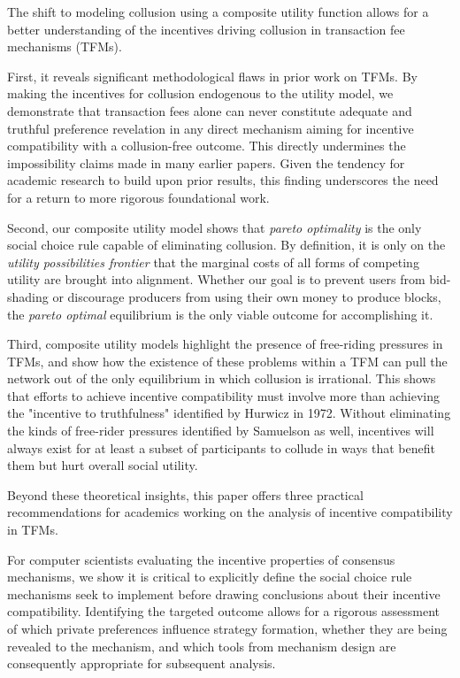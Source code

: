\documentclass[oneside]{article}   	%
\begin{document}
The shift to modeling collusion using a composite utility function allows for a better understanding of the incentives driving collusion in transaction fee mechanisms (TFMs).

First, it reveals significant methodological flaws in prior work on TFMs. By making the incentives for collusion endogenous to the utility model, we demonstrate that transaction fees alone can never constitute adequate and truthful preference revelation in any direct mechanism aiming for incentive compatibility with a collusion-free outcome. This directly undermines the impossibility claims made in many earlier papers. Given the tendency for academic research to build upon prior results, this finding underscores the need for a return to more rigorous foundational work.

Second, our composite utility model shows that \textit{pareto optimality} is the only social choice rule capable of eliminating collusion. By definition, it is only on the \textit{utility possibilities frontier} that the marginal costs of all forms of competing utility are brought into alignment. Whether our goal is to prevent users from bid-shading or discourage producers from using their own money to produce blocks, the \textit{pareto optimal} equilibrium is the only viable outcome for accomplishing it. 

Third, composite utility models highlight the presence of free-riding pressures in TFMs, and show how the existence of these problems within a TFM can pull the network out of the only equilibrium in which collusion is irrational. This shows that efforts to achieve incentive compatibility must involve more than achieving the "incentive to truthfulness" identified by Hurwicz in 1972. Without eliminating the kinds of free-rider pressures identified by Samuelson as well, incentives will always exist for at least a subset of participants to collude in ways that benefit them but hurt overall social utility.

Beyond these theoretical insights, this paper offers three practical recommendations for academics working on the analysis of incentive compatibility in TFMs.

For computer scientists evaluating the incentive properties of consensus mechanisms, we show it is critical to explicitly define the social choice rule mechanisms seek to implement before drawing conclusions about their incentive compatibility. Identifying the targeted outcome allows for a rigorous assessment of which private preferences influence strategy formation, whether they are being revealed to the mechanism, and which tools from mechanism design are consequently appropriate for subsequent analysis.
\end{document}
